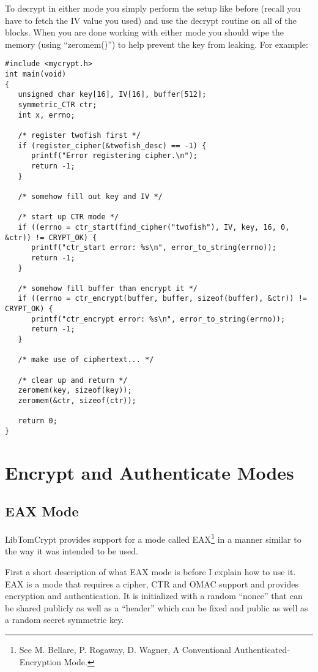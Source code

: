 \documentclass[b5paper]{book}
\begin{document}
To decrypt in either mode you simply perform the setup like before (recall you have to fetch the IV value you used)
and use the decrypt routine on all of the blocks.  When you are done working with either mode you should wipe the 
memory (using ``zeromem()'') to help prevent the key from leaking.  For example:
\newpage
\begin{small}
\begin{verbatim}
#include <mycrypt.h>
int main(void)
{
   unsigned char key[16], IV[16], buffer[512];
   symmetric_CTR ctr;
   int x, errno;

   /* register twofish first */
   if (register_cipher(&twofish_desc) == -1) {
      printf("Error registering cipher.\n");
      return -1;
   }

   /* somehow fill out key and IV */

   /* start up CTR mode */
   if ((errno = ctr_start(find_cipher("twofish"), IV, key, 16, 0, &ctr)) != CRYPT_OK) {
      printf("ctr_start error: %s\n", error_to_string(errno));
      return -1;
   }

   /* somehow fill buffer than encrypt it */
   if ((errno = ctr_encrypt(buffer, buffer, sizeof(buffer), &ctr)) != CRYPT_OK) {
      printf("ctr_encrypt error: %s\n", error_to_string(errno));
      return -1;
   }

   /* make use of ciphertext... */

   /* clear up and return */
   zeromem(key, sizeof(key));
   zeromem(&ctr, sizeof(ctr));

   return 0;
}
\end{verbatim}
\end{small}

\section{Encrypt and Authenticate Modes}

\subsection{EAX Mode}
LibTomCrypt provides support for a mode called EAX\footnote{See 
M. Bellare, P. Rogaway, D. Wagner, A Conventional Authenticated-Encryption Mode.} in a manner similar to the
way it was intended to be used.

First a short description of what EAX mode is before I explain how to use it.  EAX is a mode that requires a cipher,
CTR and OMAC support and provides encryption and authentication.  It is initialized with a random ``nonce'' that can
be shared publicly as well as a ``header'' which can be fixed and public as well as a random secret symmetric key.
\end{document}
